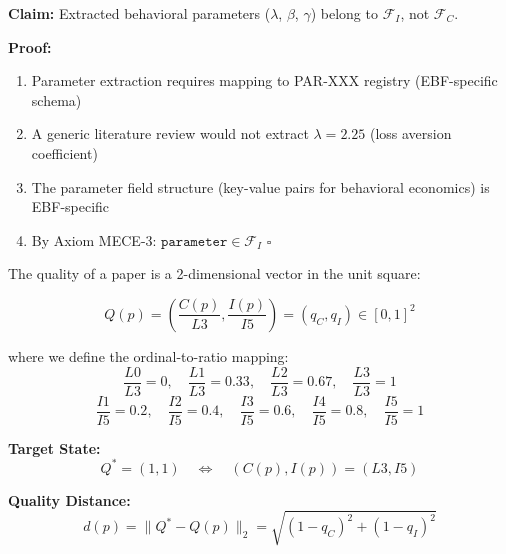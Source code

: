\begin{tcolorbox}[colback=red!5!white, colframe=red!75!black,
    title=\textbf{Theorem 1: Parameter Assignment (Derived from MECE-3)}]

\textbf{Claim:} Extracted behavioral parameters ($\lambda$, $\beta$, $\gamma$) belong to $\mathcal{F}_I$, not $\mathcal{F}_C$.

\textbf{Proof:}
\begin{enumerate}[nosep]
    \item Parameter extraction requires mapping to PAR-XXX registry (EBF-specific schema)
    \item A generic literature review would not extract $\lambda = 2.25$ (loss aversion coefficient)
    \item The parameter field structure (key-value pairs for behavioral economics) is EBF-specific
    \item By Axiom MECE-3: $\texttt{parameter} \in \mathcal{F}_I$ \quad $\square$
\end{enumerate}

\end{tcolorbox}


\begin{tcolorbox}[colback=blue!5!white, colframe=blue!75!black,
    title=\textbf{Definition 4: Paper Quality Metric $Q: \mathcal{P} \to [0, 1]^2$}]

The quality of a paper is a 2-dimensional vector in the unit square:

\begin{equation}
Q(p) = \left( \frac{C(p)}{L3}, \frac{I(p)}{I5} \right) = (q_C, q_I) \in [0, 1]^2
\end{equation}

where we define the ordinal-to-ratio mapping:
\begin{equation}
\frac{L0}{L3} = 0, \quad \frac{L1}{L3} = 0.33, \quad \frac{L2}{L3} = 0.67, \quad \frac{L3}{L3} = 1
\end{equation}
\begin{equation}
\frac{I1}{I5} = 0.2, \quad \frac{I2}{I5} = 0.4, \quad \frac{I3}{I5} = 0.6, \quad \frac{I4}{I5} = 0.8, \quad \frac{I5}{I5} = 1
\end{equation}

\textbf{Target State:}
\begin{equation}
Q^* = (1, 1) \quad \Leftrightarrow \quad (C(p), I(p)) = (L3, I5)
\end{equation}

\textbf{Quality Distance:}
\begin{equation}
d(p) = \|Q^* - Q(p)\|_2 = \sqrt{(1 - q_C)^2 + (1 - q_I)^2}
\end{equation}

\end{tcolorbox}

